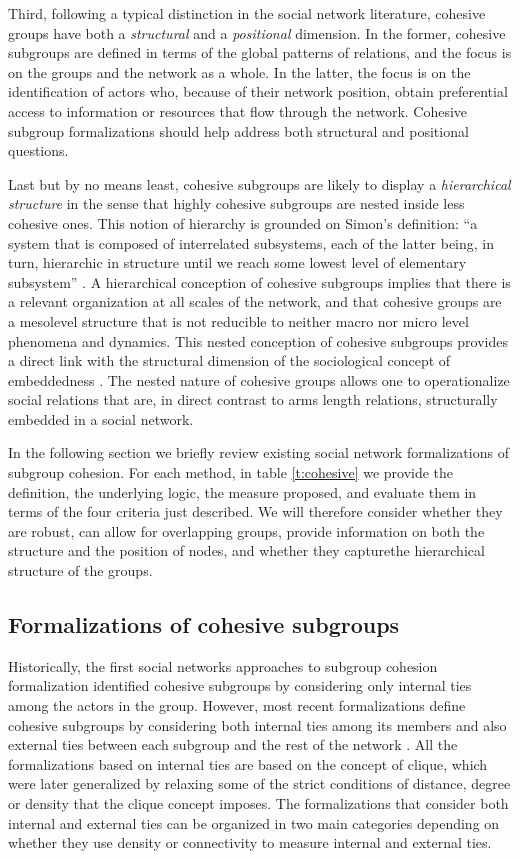 Third, following a typical distinction in the social network literature, cohesive groups have both a \emph{structural} and a \emph{positional} dimension. In the former, cohesive subgroups are defined in terms of the global patterns of relations, and the focus is on the groups and the network as a whole. In the latter, the focus is on the identification of actors who, because of their network position, obtain preferential access to information or resources that flow through the network. Cohesive subgroup formalizations should help address both structural and positional questions. 

Last but by no means least, cohesive subgroups are likely to display a \emph{hierarchical structure} in the sense that highly cohesive subgroups are nested inside less cohesive ones. This notion of hierarchy is grounded on Simon's definition: ``a system that is composed of interrelated subsystems, each of the latter being, in turn, hierarchic in structure until we reach some lowest level of elementary subsystem'' \citep[468]{simon:1962}. A hierarchical conception of cohesive subgroups implies that there is a relevant organization at all scales of the network, and that cohesive groups are a mesolevel structure that is not reducible to neither macro nor micro level phenomena and dynamics. This nested conception of cohesive subgroups provides a direct link with the structural dimension of the sociological concept of embeddedness \citep{granovetter:1985}. The nested nature of cohesive groups allows one to operationalize social relations that are, in direct contrast to arms length relations, structurally embedded in a social network.

In the following section we briefly review existing social network formalizations of subgroup cohesion.  For each method, in table \ref{t:cohesive} we provide the definition, the underlying logic, the measure proposed, and evaluate them in terms of the four criteria just described. We will therefore consider whether they are robust, can allow for overlapping groups, provide information on both the structure and the position of nodes, and whether they capturethe hierarchical structure of the groups.

\subsection{Formalizations of cohesive subgroups}

Historically, the first social networks approaches to subgroup cohesion formalization identified cohesive subgroups by considering only internal ties among the actors in the group. However, most recent formalizations define cohesive subgroups by considering both internal ties among its members and also external ties between each subgroup and the rest of the network \citep{wasserman:1994}. All the formalizations based on internal ties are based on the concept of clique, which were later generalized by relaxing some of the strict conditions of distance, degree or density that the clique concept imposes.  The formalizations that consider both internal and external ties can be organized in two main categories depending on whether they use density or connectivity to measure internal and external ties.

